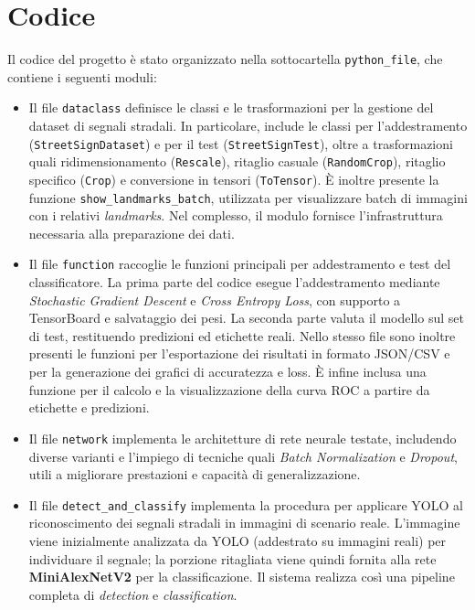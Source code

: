 \section{Codice}
Il codice del progetto è stato organizzato nella sottocartella \texttt{python\_file}, che contiene i seguenti moduli:
\begin{itemize}
    \item Il file \texttt{dataclass} definisce le classi e le trasformazioni per la gestione del dataset di segnali stradali. In particolare, include le classi per l'addestramento (\texttt{StreetSignDataset}) e per il test (\texttt{StreetSignTest}), oltre a trasformazioni quali ridimensionamento (\texttt{Rescale}), ritaglio casuale (\texttt{RandomCrop}), ritaglio specifico (\texttt{Crop}) e conversione in tensori (\texttt{ToTensor}). È inoltre presente la funzione \texttt{show\_landmarks\_batch}, utilizzata per visualizzare batch di immagini con i relativi \textit{landmarks}. Nel complesso, il modulo fornisce l'infrastruttura necessaria alla preparazione dei dati.
    \item Il file \texttt{function} raccoglie le funzioni principali per addestramento e test del classificatore. La prima parte del codice esegue l'addestramento mediante \textit{Stochastic Gradient Descent} e \textit{Cross Entropy Loss}, con supporto a TensorBoard e salvataggio dei pesi. La seconda parte valuta il modello sul set di test, restituendo predizioni ed etichette reali. Nello stesso file sono inoltre presenti le funzioni per l'esportazione dei risultati in formato JSON/CSV e per la generazione dei grafici di accuratezza e loss. È infine inclusa una funzione per il calcolo e la visualizzazione della curva ROC a partire da etichette e predizioni.
    \item Il file \texttt{network} implementa le architetture di rete neurale testate, includendo diverse varianti e l'impiego di tecniche quali \textit{Batch Normalization} e \textit{Dropout}, utili a migliorare prestazioni e capacità di generalizzazione.
    \item Il file \texttt{detect\_and\_classify} implementa la procedura per applicare YOLO al riconoscimento dei segnali stradali in immagini di scenario reale. L'immagine viene inizialmente analizzata da YOLO (addestrato su immagini reali) per individuare il segnale; la porzione ritagliata viene quindi fornita alla rete \textbf{MiniAlexNetV2} per la classificazione. Il sistema realizza così una pipeline completa di \textit{detection} e \textit{classification}.
\end{itemize}

